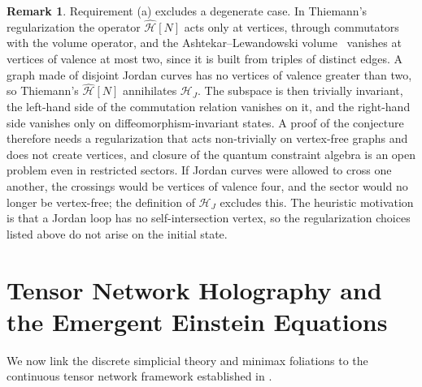 \documentclass[11pt,a4paper,reqno]{amsart}
\theoremstyle{definition}
\newtheorem{remark}[theorem]{Remark}
\numberwithin{equation}{section}
\begin{document}
\begin{remark}
Requirement (a) excludes a degenerate case. In Thiemann's regularization \cite{thiemann1998qsd} the operator $\widehat{\mathcal{H}}[N]$ acts only at vertices, through commutators with the volume operator, and the Ashtekar--Lewandowski volume~\cite{ashtekarlewandowski1997volume} vanishes at vertices of valence at most two, since it is built from triples of distinct edges. A graph made of disjoint Jordan curves has no vertices of valence greater than two, so Thiemann's $\widehat{\mathcal{H}}[N]$ annihilates $\mathscr{H}_J$. The subspace is then trivially invariant, the left-hand side of the commutation relation vanishes on it, and the right-hand side vanishes only on diffeomorphism-invariant states. A proof of the conjecture therefore needs a regularization that acts non-trivially on vertex-free graphs and does not create vertices, and closure of the quantum constraint algebra is an open problem even in restricted sectors. If Jordan curves were allowed to cross one another, the crossings would be vertices of valence four, and the sector would no longer be vertex-free; the definition of $\mathscr{H}_J$ excludes this. The heuristic motivation is that a Jordan loop has no self-intersection vertex, so the regularization choices listed above do not arise on the initial state.
\end{remark}

\section{Tensor Network Holography and the Emergent Einstein Equations}
\label{sec:holographic_emergence}

We now link the discrete simplicial theory and minimax foliations to the continuous tensor network framework established in \cite{silvafilho2026functional, silvafilho2026flows, silvafilho2026spacetime, verstraete2010continuous, swingle2012entanglement}.
\end{document}
